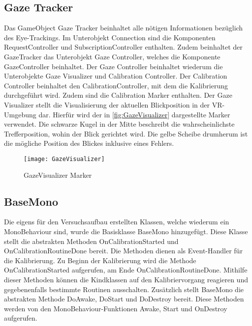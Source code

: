 \subsection{Gaze Tracker}
Das GameObject \glqq Gaze Tracker\grqq{} beinhaltet alle nötigen Informationen bezüglich des Eye-Trackings. Im Unterobjekt Connection sind die Komponenten RequestController und SubscriptionController enthalten. Zudem beinhaltet der GazeTracker das Unterobjekt Gaze Controller, welches die Komponente GazeController beinhaltet. Der Gaze Controller beinhaltet wiederum die Unterobjekte Gaze Visualizer und Calibration Controller. Der Calibration Controller beinhaltet den CalibrationController, mit dem die Kalibrierung durchgeführt wird. Zudem sind die Calibration Marker enthalten. Der Gaze Visualizer stellt die Visualisierung der aktuellen Blickposition in der \ac{VR}-Umgebung dar. Hierfür wird der in \autoref{fig:GazeVisualizer} dargestellte Marker verwendet. Die schwarze Kugel in der Mitte beschreibt die wahrscheinlichste Trefferposition, wohin der Blick gerichtet wird. Die gelbe Scheibe drumherum ist die mögliche Position des Blickes inklusive eines Fehlers.

\begin{figure}[!htbp]
	\centering
	\texttt{[image: GazeVisualizer]}
	\caption[GazeVisualizer Marker]{GazeVisualizer Marker}
	\label{fig:GazeVisualizer}
\end{figure}

\subsection{BaseMono}
Die eigens für den Versuchsaufbau erstellten Klassen, welche wiederum ein MonoBehaviour sind, wurde die Basisklasse {\ttfamily BaseMono} hinzugefügt. Diese Klasse stellt die abstrakten Methoden {\ttfamily OnCalibrationStarted} und {\ttfamily OnCalibrationRoutineDone} bereit. Die Methoden dienen als Event-Handler für die Kalibrierung. Zu Beginn der Kalibrierung wird die Methode OnCalibrationStarted aufgerufen, am Ende OnCalibrationRoutineDone. Mithilfe dieser Methoden können die Kindklassen auf den Kalibriervorgang reagieren und gegebenenfalls bestimmte Routinen ausschalten. Zusätzlich stellt BaseMono die abstrakten Methode {\ttfamily DoAwake}, {\ttfamily DoStart} und {\ttfamily DoDestroy} bereit. Diese Methoden werden von den MonoBehaviour-Funktionen {\ttfamily Awake}, {\ttfamily Start} und {\ttfamily OnDestroy} aufgerufen.

